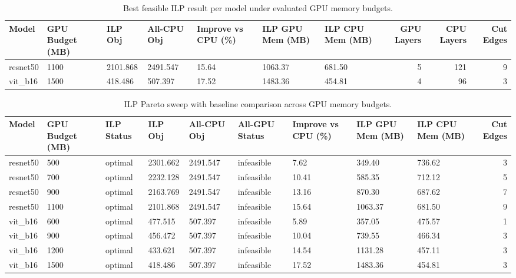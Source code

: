 \begin{table}[t]
\centering
\caption{Best feasible ILP result per model under evaluated GPU memory budgets.}
\label{tab:ilp-best-per-model}
\begin{tabular}{lllllllrrr}
\toprule
Model & GPU Budget (MB) & ILP Obj & All-CPU Obj & Improve vs CPU (\%) & ILP GPU Mem (MB) & ILP CPU Mem (MB) & GPU Layers & CPU Layers & Cut Edges \\
\midrule
resnet50 & 1100 & 2101.868 & 2491.547 & 15.64 & 1063.37 & 681.50 & 5 & 121 & 9 \\
vit_b16 & 1500 & 418.486 & 507.397 & 17.52 & 1483.36 & 454.81 & 4 & 96 & 3 \\
\bottomrule
\end{tabular}

\end{table}

\begin{table}[t]
\centering
\caption{ILP Pareto sweep with baseline comparison across GPU memory budgets.}
\label{tab:ilp-budget-sweep}
\begin{tabular}{lllllllllr}
\toprule
Model & GPU Budget (MB) & ILP Status & ILP Obj & All-CPU Obj & All-GPU Status & Improve vs CPU (\%) & ILP GPU Mem (MB) & ILP CPU Mem (MB) & Cut Edges \\
\midrule
resnet50 & 500 & optimal & 2301.662 & 2491.547 & infeasible & 7.62 & 349.40 & 736.62 & 3 \\
resnet50 & 700 & optimal & 2232.128 & 2491.547 & infeasible & 10.41 & 585.35 & 712.12 & 5 \\
resnet50 & 900 & optimal & 2163.769 & 2491.547 & infeasible & 13.16 & 870.30 & 687.62 & 7 \\
resnet50 & 1100 & optimal & 2101.868 & 2491.547 & infeasible & 15.64 & 1063.37 & 681.50 & 9 \\
vit_b16 & 600 & optimal & 477.515 & 507.397 & infeasible & 5.89 & 357.05 & 475.57 & 1 \\
vit_b16 & 900 & optimal & 456.472 & 507.397 & infeasible & 10.04 & 739.55 & 466.34 & 3 \\
vit_b16 & 1200 & optimal & 433.621 & 507.397 & infeasible & 14.54 & 1131.28 & 457.11 & 3 \\
vit_b16 & 1500 & optimal & 418.486 & 507.397 & infeasible & 17.52 & 1483.36 & 454.81 & 3 \\
\bottomrule
\end{tabular}

\end{table}
